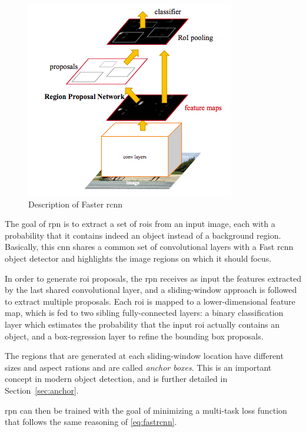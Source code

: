 \documentclass[%
    corpo=12pt,
    twoside,
    stile=classica,   
    tipotesi=magistrale,
    evenboxes,
    english,
	numerazioneromana,
]{toptesi}
\begin{document}
\begin{figure}[ht]
	\centering
	\includegraphics[width=.5\linewidth]{imgs/fasterrcnn.png}
	\caption{Description of Faster \gls{rcnn}\cite{ren2016faster}}
	\label{fig:fasterrcnn}
\end{figure}

\medskip
The goal of \gls{rpn} is to extract a set of \glspl{roi} from an input image, each with a probability that it contains indeed an object instead of a background region. Basically, this \gls{cnn} shares a common set of convolutional layers with a Fast \gls{rcnn} object detector and highlights the image regions on which it should focus.

In order to generate \gls{roi} proposals, the \gls{rpn} receives as input the features extracted by the last shared convolutional layer, and a sliding-window approach is followed to extract multiple proposals. Each \gls{roi} is mapped to a lower-dimensional feature map, which is fed to two sibling fully-connected layers: a binary classification layer which estimates the probability that the input \gls{roi} actually contains an object, and a box-regression layer to refine the bounding box proposals.

The regions that are generated at each sliding-window location have different sizes and aspect rations and are called \textit{anchor boxes}. This is an important concept in modern object detection, and is further detailed in Section~\ref{sec:anchor}.

\Gls{rpn} can then be trained with the goal of minimizing a multi-task loss function that follows the same reasoning of \eqref{eq:fastrcnn}.
\end{document}
